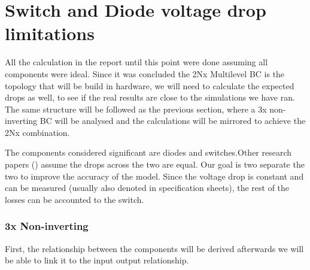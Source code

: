 \section{Switch and Diode voltage drop limitations}\label{ch:DROPS}

All the calculation in the report until this point were done assuming all components were ideal. Since it was concluded the 2Nx Multilevel BC is the topology that will be build in hardware, we will need to calculate the expected drops as well, to see if the real results are close to the simulations we have ran. 
The same structure will be followed as the previous section, where a 3x non-inverting BC will be analysed and the calculations will be mirrored to achieve the 2Nx combination.

The components considered significant are diodes and switches.Other research papers (\cite{Padmanaban2015,Rosas-Caro2008}) assume the drops across the two are equal. Our goal is two separate the two to improve the accuracy of the model. Since the voltage drop is constant and can be measured (usually also denoted in specification sheets), the rest of the losses can be accounted to the switch.

\subsubsection{3x Non-inverting}

First, the relationship between the components will be derived afterwards we will be able to link it to the input output relationship.

